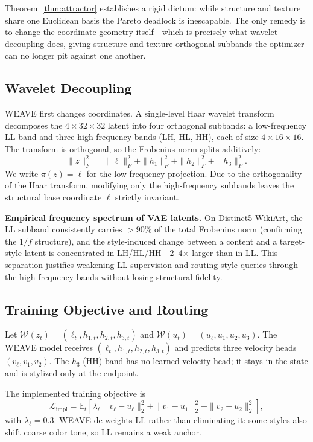 \documentclass[letterpaper]{article}
\begin{document}
Theorem~\ref{thm:attractor} establishes a rigid dictum: while structure and texture share one Euclidean basis the Pareto deadlock is inescapable. The only remedy is to change the coordinate geometry itself---which is precisely what wavelet decoupling does, giving structure and texture orthogonal subbands the optimizer can no longer pit against one another.

\subsection{Wavelet Decoupling}
\label{sec:fiberbundle}

WEAVE first changes coordinates.
A single-level Haar wavelet transform decomposes the $4{\times}32{\times}32$ latent into four orthogonal subbands: a low-frequency LL band and three high-frequency bands (LH, HL, HH), each of size $4{\times}16{\times}16$.
The transform is orthogonal, so the Frobenius norm splits additively:
\begin{equation}
\|z\|_F^2 = \|\ell\|_F^2 + \|h_1\|_F^2 + \|h_2\|_F^2 + \|h_3\|_F^2.
\end{equation}
We write $\pi(z)=\ell$ for the low-frequency projection.
Due to the orthogonality of the Haar transform, modifying only the high-frequency subbands leaves the structural base coordinate $\ell$ strictly invariant.

\textbf{Empirical frequency spectrum of VAE latents.}
On Distinct5-WikiArt, the LL subband consistently carries $>\!90\%$ of the total Frobenius norm (confirming the $1/f$ structure), and the style-induced change between a content and a target-style latent is concentrated in LH/HL/HH---2--4$\times$ larger than in LL.
This separation justifies weakening LL supervision and routing style queries through the high-frequency bands without losing structural fidelity.

\subsection{Training Objective and Routing}
\label{sec:baselock}

Let $\mathcal W(z_t) = (\ell_t,h_{1,t},h_{2,t},h_{3,t})$ and $\mathcal W(u_t) = (u_\ell,u_1,u_2,u_3)$.
The WEAVE model receives $(\ell_t,h_{1,t},h_{2,t},h_{3,t})$ and predicts three velocity heads $(v_\ell,v_1,v_2)$.
The $h_3$ (HH) band has no learned velocity head; it stays in the state and is stylized only at the endpoint.

The implemented training objective is
\begin{equation}
\mathcal L_{\mathrm{impl}}
=
\mathbb E_t\!\left[
\lambda_\ell\|v_\ell-u_\ell\|_2^2
+ \|v_1-u_1\|_2^2
+ \|v_2-u_2\|_2^2
\right],
\label{eq:weave-loss}
\end{equation}
with $\lambda_\ell = 0.3$.
WEAVE de-weights LL rather than eliminating it: some styles also shift coarse color tone, so LL remains a weak anchor.
\end{document}
